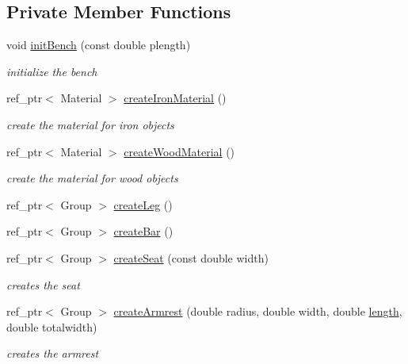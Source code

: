\subsection*{Private Member Functions}
\begin{DoxyCompactItemize}
\item 
void \hyperlink{classbrtr_1_1_bench_a2813d4878b8a5ef09219323b2f6c9cf5}{init\+Bench} (const double plength)
\begin{DoxyCompactList}\small\item\em initialize the bench \end{DoxyCompactList}\item 
ref\+\_\+ptr$<$ Material $>$ \hyperlink{classbrtr_1_1_bench_aafa199aa2218d57b290d99843a1443d4}{create\+Iron\+Material} ()
\begin{DoxyCompactList}\small\item\em create the material for iron objects \end{DoxyCompactList}\item 
ref\+\_\+ptr$<$ Material $>$ \hyperlink{classbrtr_1_1_bench_a57d6d3f038d3f0e8d5f8b83895a6670a}{create\+Wood\+Material} ()
\begin{DoxyCompactList}\small\item\em create the material for wood objects \end{DoxyCompactList}\item 
ref\+\_\+ptr$<$ Group $>$ \hyperlink{classbrtr_1_1_bench_aefe5a9043a63e13d83c31a42046c6912}{create\+Leg} ()
\item 
ref\+\_\+ptr$<$ Group $>$ \hyperlink{classbrtr_1_1_bench_ae17e8e692f6c6deb7b722b5df58dc04b}{create\+Bar} ()
\item 
ref\+\_\+ptr$<$ Group $>$ \hyperlink{classbrtr_1_1_bench_a0547e73d10f329b2a9b4453b6319f472}{create\+Seat} (const double width)
\begin{DoxyCompactList}\small\item\em creates the seat \end{DoxyCompactList}\item 
ref\+\_\+ptr$<$ Group $>$ \hyperlink{classbrtr_1_1_bench_a9956994e6a20cbbd0f0ce9eb6df25917}{create\+Armrest} (double radius, double width, double \hyperlink{classbrtr_1_1_bench_a81188a60871201d741c288396430964d}{length}, double totalwidth)
\begin{DoxyCompactList}\small\item\em creates the armrest \end{DoxyCompactList}\item 

\end{DoxyCompactItemize}
